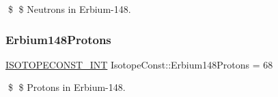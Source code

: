 \$ \$ Neutrons in Erbium-\/148. \mbox{\label{group___isotope_const-_erbium-_er148_gac0799d563a3aad41354741c4a7dc277f}} 
\subsubsection{\texorpdfstring{Erbium148\+Protons}{Erbium148Protons}}
{\footnotesize\ttfamily \mbox{\hyperlink{group___isotope_const-_macros_ga5f18360b3e99483a35c32d789e62621c}{I\+S\+O\+T\+O\+P\+E\+C\+O\+N\+S\+T\+\_\+\+I\+NT}} Isotope\+Const\+::\+Erbium148\+Protons = 68}

\$ \$ Protons in Erbium-\/148. 